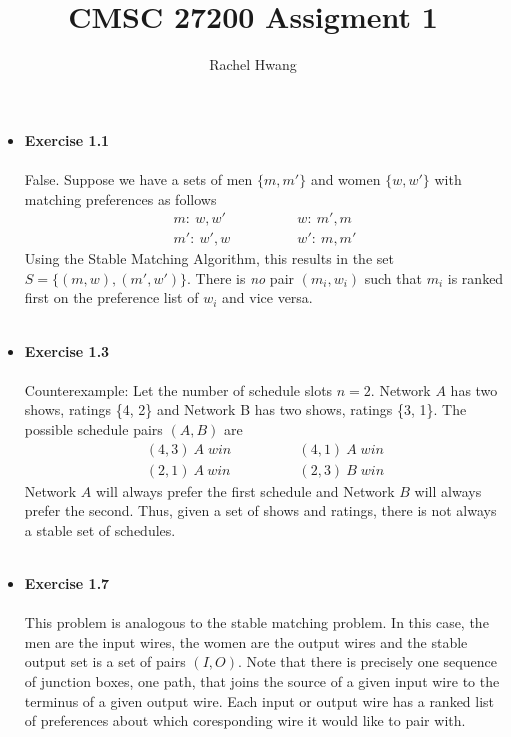 \documentclass[a4paper]{article}
\title{CMSC 27200 Assigment 1}
\author{Rachel Hwang}
\begin{document}
\maketitle

\begin{itemize}



\item{\textbf{Exercise 1.1}} \\
\\
False. Suppose we have a sets of men $\{m, m'\}$ and women $\{w, w'\}$ with matching preferences as follows
\begin{align*}
m: \: w, w' \hspace{48pt}& w: \: m', m \\
m': \: w', w \hspace{48pt}& w': \: m, m'
\end{align*}
Using the Stable Matching Algorithm, this results in the set $S= \{(m, w), (m', w')\}$. There is \emph{no} pair $(m_i, w_i)$ such that $m_i$ is ranked first on the preference list of $w_i$ and vice versa. 
\\ 
\\

\item{\textbf{Exercise 1.3}} \\
\\
Counterexample: Let the number of schedule slots $n = 2$. Network $A$ has two shows, ratings \{4, 2\} and Network B has two shows, ratings \{3, 1\}. The possible schedule pairs $(A, B)$ are 
\begin{align*}
(4,3)\:A\;win\hspace{48pt}& (4,1)\:A\;win\\
(2,1)\:A\:win\hspace{48pt}& (2,3)\:B\;win
\end{align*}
Network $A$ will always prefer the first schedule and Network $B$ will always prefer the second. Thus, given a set of shows and ratings, there is not always a stable set of schedules. 
\\
\\

\item{\textbf{Exercise 1.7}} \\
\\
This problem is analogous to the stable matching problem. In this case, the men are the input wires, the women are the output wires and the stable output set is a set of pairs $(I, O)$. Note that there is precisely one sequence of junction boxes, one path, that joins the source of a given input wire to the terminus of a given output wire. Each input or output wire has a ranked list of preferences about which coresponding wire it would like to pair with.


\end{itemize}
\end{document}
